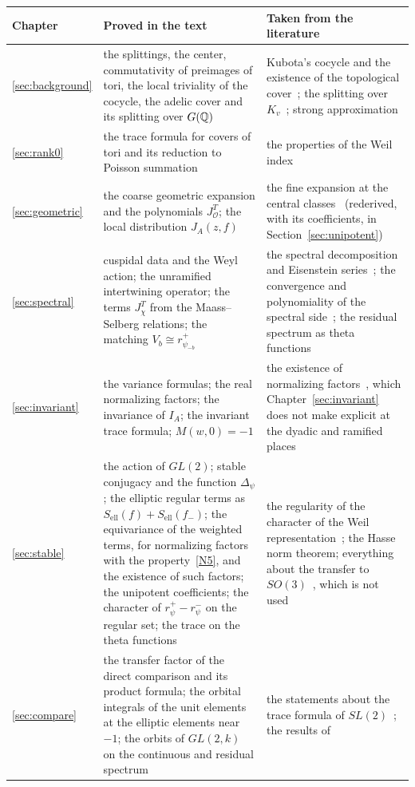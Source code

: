 \begin{center}
\begin{tabular}{p{}p{}p{}}
Chapter & Proved in the text & Taken from the literature\\\hline
\ref{sec:background} & the splittings, the center, commutativity of
  preimages of tori, the local triviality of the cocycle, the adelic
  cover and its splitting over $G(\mathbb{Q})$ &
  Kubota's cocycle and the existence of the topological
  cover~\cite{Ku67,Mo68}; the splitting over $K_v$~\cite{Ku69}; strong
  approximation\\
\ref{sec:rank0} & the trace formula for covers of tori and its
  reduction to Poisson summation & the properties of the Weil
  index~\cite{We64}\\
\ref{sec:geometric} & the coarse geometric expansion and the
  polynomials $J^T_{\mathcal O}$; the local distribution $J_A(z,f)$ &
  the fine expansion at the central classes~\cite{Ar86,Li14a} (rederived,
  with its coefficients, in Section~\ref{sec:unipotent})\\
\ref{sec:spectral} & cuspidal data and the Weyl action; the unramified
  intertwining operator; the terms $J^T_\chi$ from the Maass--Selberg
  relations; the matching $V_b\cong r^+_{\psi_{-b}}$ &
  the spectral decomposition and Eisenstein series~\cite{La76,MW95}; the
  convergence and polynomiality of the spectral
  side~\cite{Ar80,Li13}; the residual spectrum as theta
  functions~\cite{Ge76,GPS80,Wa80}\\
\ref{sec:invariant} & the variance formulas; the real normalizing
  factors; the invariance of $I_A$; the invariant trace formula;
  $M(w,0)=-1$ & the existence of normalizing factors~\cite{Ar89,Li12a},
  which Chapter~\ref{sec:invariant} does not make explicit at the dyadic
  and ramified places\\
\ref{sec:stable} & the action of $GL(2)$; stable conjugacy and the
  function $\Delta_\psi$; the elliptic regular terms as
  $S_{\mathrm{ell}}(f)+S_{\mathrm{ell}}(f_-)$; the equivariance of the
  weighted terms, for normalizing factors with the property~\ref{N5},
  and the existence of such factors; the unipotent coefficients; the character of
  $r^+_\psi-r^-_\psi$ on the regular set; the trace on the theta
  functions & the regularity of the character of the Weil
  representation~\cite{Ma99,Th08}; the Hasse norm theorem; everything
  about the transfer to $SO(3)$~\cite{Li11,Li15,Li21}, which is not used\\
\ref{sec:compare} & the transfer factor of the direct comparison and
  its product formula; the orbital integrals of the unit elements at the
  elliptic elements near $-1$; the orbits of $GL(2,k)$ on the continuous
  and residual spectrum & the statements about the trace formula of
  $SL(2)$~\cite{LL79,GJ79}; the results of~\cite{JC26}
\end{tabular}
\end{center}

